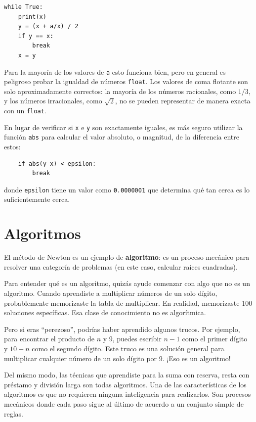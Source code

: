 \documentclass[10pt]{book}
\begin{document}
\begin{verbatim}
while True:
    print(x)
    y = (x + a/x) / 2
    if y == x:
        break
    x = y
\end{verbatim}
%
Para la mayoría de los valores de {\tt a} esto funciona bien, pero en general es
peligroso probar la igualdad de números {\tt float}.
Los valores de coma flotante son solo aproximadamente correctos:
la mayoría de los números racionales, como $1/3$, y los números irracionales, como
$\sqrt{2}$, no se pueden representar de manera exacta con un {\tt float}.

En lugar de verificar si {\tt x} e {\tt y} son exactamente iguales, es
más seguro utilizar la función {\tt abs} para calcular el
valor absoluto, o magnitud, de la diferencia entre estos:

\begin{verbatim}
    if abs(y-x) < epsilon:
        break
\end{verbatim}
%
donde \verb"epsilon" tiene un valor como {\tt 0.0000001} que
determina qué tan cerca es lo suficientemente cerca.


\section{Algoritmos}

El método de Newton es un ejemplo de {\bf algoritmo}: es un
proceso mecánico para resolver una categoría de problemas (en este
caso, calcular raíces cuadradas).

Para entender qué es un algoritmo, quizás ayude comenzar con
algo que no es un algoritmo.  Cuando aprendiste a multiplicar
números de un solo dígito, probablemente memorizaste la tabla de multiplicar.
En realidad, memorizaste 100 soluciones específicas.  Esa clase de
conocimiento no es algorítmica.

Pero si eras ``perezoso'', podrías haber aprendido algunos
trucos.  Por ejemplo, para encontrar el producto de $n$ y 9, puedes
escribir $n-1$ como el primer dígito y $10-n$ como el segundo
dígito.  Este truco es una solución general para multiplicar cualquier
número de un solo dígito por 9.  ¡Eso es un algoritmo!

Del mismo modo, las técnicas que aprendiste para la suma con reserva,
resta con préstamo y división larga son todas algoritmos.  Una
de las características de los algoritmos es que no requieren ninguna
inteligencia para realizarlos.  Son procesos mecánicos donde
cada paso sigue al último de acuerdo a un conjunto simple de reglas.
\end{document}
